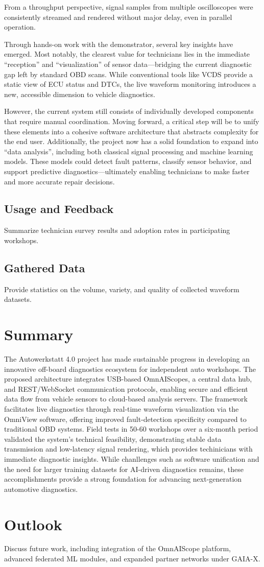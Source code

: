 From a throughput perspective, signal samples from multiple oscilloscopes were consistently streamed and rendered without major delay, even in parallel operation. 

Through hands-on work with the demonstrator, several key insights have emerged. 
Most notably, the clearest value for technicians lies in the immediate ``reception'' and ``visualization'' of sensor data—bridging the current diagnostic gap left by standard OBD scans. 
While conventional tools like VCDS provide a static view of ECU status and DTCs, the live waveform monitoring introduces a new, accessible dimension to vehicle diagnostics.

However, the current system still consists of individually developed components that require manual coordination. 
Moving forward, a critical step will be to unify these elements into a cohesive software architecture that abstracts complexity for the end user. 
Additionally, the project now has a solid foundation to expand into ``data analysis'', including both classical signal processing and machine learning models. 
These models could detect fault patterns, classify sensor behavior, and support predictive diagnostics—ultimately enabling technicians to make faster and more accurate repair decisions.



\subsection{Usage and Feedback}
Summarize technician survey results and adoption rates in participating workshops.

\subsection{Gathered Data}
Provide statistics on the volume, variety, and quality of collected waveform datasets.

\section{Summary}
The Autowerkstatt 4.0 project has made sustainable progress in developing an innovative off-board diagnostics ecosystem for independent auto workshops.
The proposed architecture integrates USB-based OmnAIScopes, a central data hub, and REST/WebSocket communication protocols, 
enabling secure and efficient data flow from vehicle sensors to cloud-based analysis servers. 
The framework facilitates live diagnostics through real-time waveform visualization via the OmniView software, 
offering improved fault-detection specificity compared to traditional OBD systems.
Field tests in 50-60 workshops over a six-month period validated the system's technical feasibility, demonstrating stable data transmission 
and low-latency signal rendering, which provides techinicians with immediate diagnostic insights. 
While chanllenges such as software unification and the need for larger training datasets for AI-driven diagnostics remains, 
these accomplishments provide a strong foundation for advancing next-generation automotive diagnostics.

\section{Outlook}
Discuss future work, including integration of the OmnAIScope platform, advanced federated ML modules, and expanded partner networks under GAIA-X.


